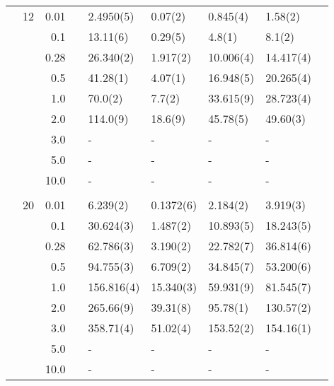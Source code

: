 \begin{table}[H]
\begin{tabularx}{\textwidth}{R{1cm}rrcR{2.3cm}R{2.3cm}R{2.3cm}R{2.3cm}R{1cm}}
		&12 & 0.01 && 2.4950(5) & 0.07(2) & 0.845(4) & 1.58(2) \\
		&& 0.1 && 13.11(6) & 0.29(5) & 4.8(1) & 8.1(2) \\
		&& 0.28 && 26.340(2) & 1.917(2) & 10.006(4) & 14.417(4) \\
		&& 0.5 && 41.28(1) & 4.07(1) & 16.948(5) & 20.265(4) \\
		&& 1.0 && 70.0(2) & 7.7(2) & 33.615(9) & 28.723(4) \\
		&& 2.0 && 114.0(9) & 18.6(9) & 45.78(5) & 49.60(3) \\
		&& 3.0 && - & - & - & - \\ 
		&& 5.0 && - & - & - & -\\
		&& 10.0 && - & - & - & -\\
		\hdashline \\
		
		&20 & 0.01 && 6.239(2) & 0.1372(6) & 2.184(2) & 3.919(3) \\
		&& 0.1 && 30.624(3) & 1.487(2) & 10.893(5) & 18.243(5) \\
		&& 0.28 && 62.786(3) & 3.190(2) & 22.782(7) & 36.814(6) \\
		&& 0.5 && 94.755(3) & 6.709(2) & 34.845(7) & 53.200(6) \\
		&& 1.0 && 156.816(4) & 15.340(3) & 59.931(9) & 81.545(7) \\
		&& 2.0 && 265.66(9) & 39.31(8) & 95.78(1) & 130.57(2) \\
		&& 3.0 && 358.71(4) & 51.02(4) & 153.52(2) & 154.16(1) \\ 
		&& 5.0 && - & - & - & -\\
		&& 10.0 && - & - & - & -\\
		\hline\hline
	\end{tabularx}
\end{table}

